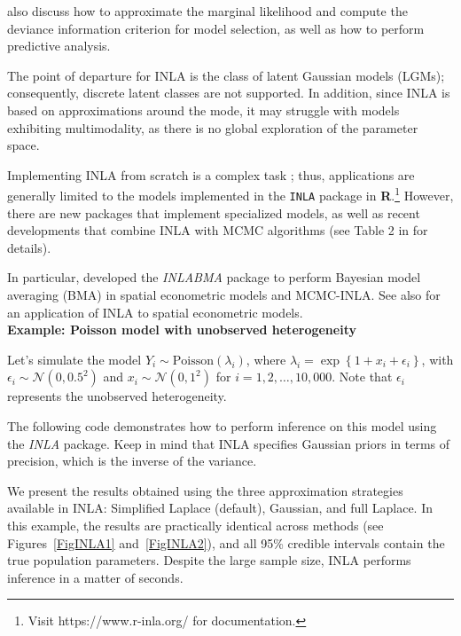 \cite{rue2009approximate} also discuss how to approximate the marginal likelihood and compute the deviance information criterion \cite{spiegelhalter2002bayesian} for model selection, as well as how to perform predictive analysis. 

The point of departure for INLA is the class of latent Gaussian models (LGMs); consequently, discrete latent classes are not supported. In addition, since INLA is based on approximations around the mode, it may struggle with models exhibiting multimodality, as there is no global exploration of the parameter space. 

Implementing INLA from scratch is a complex task \cite{martino2019integrated}; thus, applications are generally limited to the models implemented in the \texttt{INLA} package in \textbf{R}.\footnote{Visit https://www.r-inla.org/ for documentation.} However, there are new packages that implement specialized models, as well as recent developments that combine INLA with MCMC algorithms (see Table 2 in \cite{martino2019integrated} for details). 

In particular, \cite{bivand2015spatial} developed the \textit{INLABMA} package to perform Bayesian model averaging (BMA) in spatial econometric models and MCMC-INLA. See also \cite{gomez2021estimating} for an application of INLA to spatial econometric models.\\

\textbf{Example: Poisson model with unobserved heterogeneity}

Let's simulate the model $Y_i \sim \text{Poisson}(\lambda_i)$, where $\lambda_i = \exp\left\{1 + x_i + \epsilon_i\right\}$, with $\epsilon_i \sim \mathcal{N}(0, 0.5^2)$ and $x_i \sim \mathcal{N}(0, 1^2)$ for $i = 1, 2, \dots, 10,\!000$. Note that $\epsilon_i$ represents the unobserved heterogeneity.

The following code demonstrates how to perform inference on this model using the \textit{INLA} package. Keep in mind that INLA specifies Gaussian priors in terms of precision, which is the inverse of the variance.

We present the results obtained using the three approximation strategies available in INLA: Simplified Laplace (default), Gaussian, and full Laplace. In this example, the results are practically identical across methods (see Figures~\ref{FigINLA1} and~\ref{FigINLA2}), and all 95\% credible intervals contain the true population parameters. Despite the large sample size, INLA performs inference in a matter of seconds.

